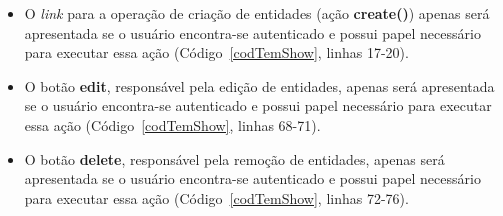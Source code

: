 \begin{itemize}

\item O {\it link} para a operação de criação de entidades (ação {\bf create()})
  apenas será  apresentada se o  usuário encontra-se autenticado e  possui papel
  necessário para executar essa ação (Código~\ref{codTemShow}, linhas 17-20).

\vspace{0.3cm}

\item  O botão {\bf  edit}, responsável  pela edição  de entidades,  apenas será
  apresentada  se o usuário  encontra-se autenticado  e possui  papel necessário
  para executar essa ação (Código~\ref{codTemShow}, linhas 68-71).  

\vspace{0.3cm}
 
\item O botão  {\bf delete}, responsável pela remoção  de entidades, apenas será
  apresentada  se o usuário  encontra-se autenticado  e possui  papel necessário
  para executar essa ação (Código~\ref{codTemShow}, linhas 72-76).

\end{itemize}

